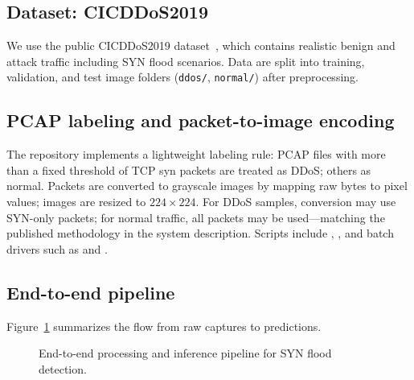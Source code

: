 \subsection{Dataset: CICDDoS2019}
We use the public CICDDoS2019 dataset~\cite{cic2019ddos}, which contains
realistic benign and attack traffic including SYN flood scenarios. Data are
split into training, validation, and test image folders (\texttt{ddos/},
\texttt{normal/}) after preprocessing.

\subsection{PCAP labeling and packet-to-image encoding}
\label{sec:pipeline}
The repository implements a lightweight labeling rule: PCAP files with more
than a fixed threshold of TCP \gls{syn} packets are treated as DDoS; others as
normal. Packets are converted to grayscale images by mapping raw bytes to pixel
values; images are resized to $224 \times 224$. For DDoS samples, conversion may
use SYN-only packets; for normal traffic, all packets may be used---matching the
published methodology in the system description. Scripts include
, , and batch drivers
such as  and
.

\subsection{End-to-end pipeline}
Figure~\ref{fig:pipeline} summarizes the flow from raw captures to predictions.

\begin{figure}[htbp]
  \centering
  \caption{End-to-end processing and inference pipeline for SYN flood detection.}
  \label{fig:pipeline}
\end{figure}

